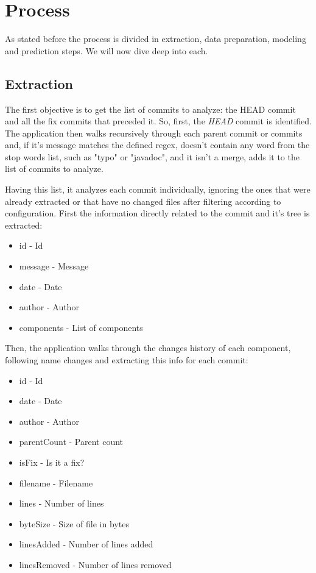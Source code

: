 \section{Process}

As stated before the process is divided in extraction, data preparation, modeling and prediction steps. We will now dive deep into each.

\subsection{Extraction}

The first objective is to get the list of commits to analyze: the HEAD commit and all the fix commits that preceded it. 
So, first, the \emph{HEAD} commit is identified. The application then walks recursively through each parent commit or commits and,
if it's message matches the defined regex, doesn't contain any word from the stop words list, such as "typo" or "javadoc", and it isn't a merge, adds it to the list of commits to analyze.


Having this list, it analyzes each commit individually, ignoring the ones that were already extracted or that have no changed files after filtering
according to configuration.
First the information directly related to the commit and it's tree is extracted:
%
\begin{itemize}
\item id - Id
\item message - Message
\item date - Date
\item author - Author
\item components - List of components
\end{itemize}

Then, the application walks through the changes history of each component, following name changes and extracting this info for each commit:
%
\begin{itemize}
\item id - Id
\item date - Date
\item author - Author
\item parentCount - Parent count
\item isFix - Is it a fix?
\item filename - Filename
\item lines - Number of lines
\item byteSize - Size of file in bytes
\item linesAdded - Number of lines added
\item linesRemoved - Number of lines removed
\end{itemize}

